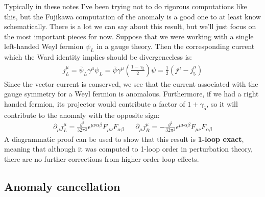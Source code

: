 \documentclass[11pt, oneside]{article}   	%
\theoremstyle{definition}
\numberwithin{equation}{subsection}		%
\begin{document}
Typically in these notes I've been trying not to do rigorous computations like this, but the Fujikawa computation of the anomaly is a good one to 
at least know schematically. There is a lot we can say about this result, but we'll just focus on the most important pieces for now. Suppose that 
we were working with a single left-handed Weyl fermion $\psi_L$ in a gauge theory. Then the corresponding current 
which the Ward identity implies should be divergenceless is:
\begin{align}
	j_L^\mu = \overline\psi_L \gamma^\mu\psi_L = \overline\psi \gamma^\mu\left(\frac{1 - \gamma_5}{2}\right)\psi = \frac{1}{2}(j^\mu - j_5^\mu)
\end{align}
Since the vector current is conserved, we see that the current associated with the gauge symmetry for a Weyl fermion is anomalous. Furthermore, 
if we had a right handed fermion, its projector would contribute a factor of $1 + \gamma_5$, so it will contribute to the anomaly with the opposite sign:
\begin{align}
	\partial_\mu j_L^\mu = \frac{g^2}{32\pi^2}\epsilon^{\mu\nu\alpha\beta} F_{\mu\nu} F_{\alpha\beta} && \partial_\mu j_R^\mu = -\frac{g^2}{32\pi^2}\epsilon^{\mu\nu\alpha\beta} F_{\mu\nu} F_{\alpha\beta}
\end{align}
A diagrammatic proof can be used to show that this result is \textbf{1-loop exact}, meaning that although it was computed to 1-loop order in perturbation theory, 
there are no further corrections from higher order loop effects. 

\subsection{Anomaly cancellation}
\end{document}
